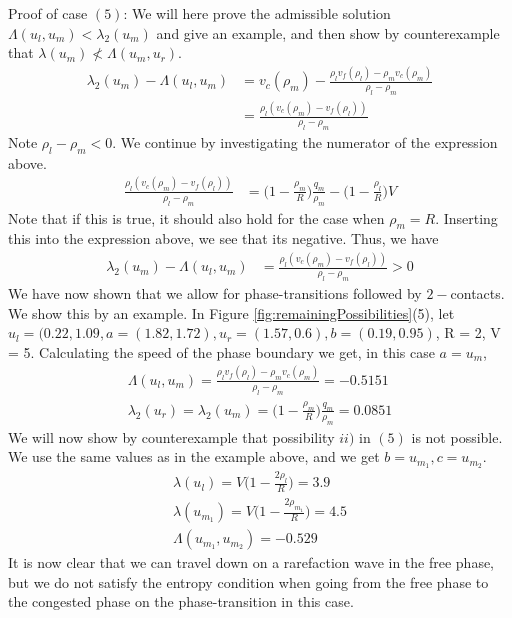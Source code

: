 \documentclass[10pt]{article}
\numberwithin{equation}{section}
\begin{document}
Proof of case $(5)$: \newline
We will here prove the admissible solution $\Lambda(u_l,u_m) < \lambda_2(u_m) $ and give an example, and then show by counterexample that $\lambda(u_m) \nless \Lambda(u_m, u_r)$. 
\begin{align*}
    \lambda_2(u_m) - \Lambda(u_l, u_m) &= v_c(\rho_m) - \frac{\rho_l v_f(\rho_l) - \rho_m v_c(\rho_m)}{\rho_l - \rho_m} \\
    &= \frac{\rho_l ( v_c(\rho_m) - v_f(\rho_l) )}{\rho_l - \rho_m}
\end{align*}
Note $\rho_l - \rho_m < 0$. We continue by investigating the numerator of the expression above. 
\begin{align*}
    \frac{\rho_l ( v_c(\rho_m) - v_f(\rho_l) )}{\rho_l - \rho_m} &= \bigg( 1 - \frac{\rho_m}{R}\bigg) \frac{q_m}{\rho_m} - \bigg( 1 - \frac{\rho_l}{R}\bigg)V
\end{align*}
Note that if this is true, it should also hold for the case when $\rho_m = R$. Inserting this into the expression above, we see that its negative. Thus, we have
\begin{align*}
    \lambda_2(u_m) - \Lambda(u_l, u_m)
    &= \frac{\rho_l ( v_c(\rho_m) - v_f(\rho_l) )}{\rho_l - \rho_m} > 0
\end{align*}
We have now shown that we allow for phase-transitions followed by $2-$contacts. We show this by an example. In Figure \ref{fig:remainingPossibilities}(5), let $u_l = (0.22, 1.09, a = (1.82,1.72), u_r = (1.57, 0.6), b = (0.19, 0.95)$, R = 2, V = 5. Calculating the speed of the phase boundary we get, in this case $a = u_m$, 
\begin{align*}
    \Lambda(u_l, u_m) = \frac{\rho_l v_f(\rho_l) - \rho_m v_c(\rho_m)}{\rho_l - \rho_m} = -0.5151 \\
    \lambda_2(u_r) = \lambda_2(u_m) = \bigg( 1 - \frac{\rho_m}{R}\bigg) \frac{q_m}{\rho_m} = 0.0851
\end{align*}
We will now show by counterexample that possibility $ii)$ in $(5)$ is not possible. We use the same values as in the example above, and we get $b = u_{m_1}, c = u_{m_2}$.
\begin{align*}
    \lambda(u_l) = V\bigg( 1- \frac{2\rho_l}{R}\bigg) = 3.9 \\
    \lambda(u_{m_1}) = V\bigg( 1- \frac{2\rho_{m_1}}{R}\bigg) = 4.5 \\
    \Lambda(u_{m_1}, u_{m_2}) = -0.529
\end{align*}
It is now clear that we can travel down on a rarefaction wave in the free phase, but we do not satisfy the entropy condition when going from the free phase to the congested phase on the phase-transition in this case. 
\end{document}
